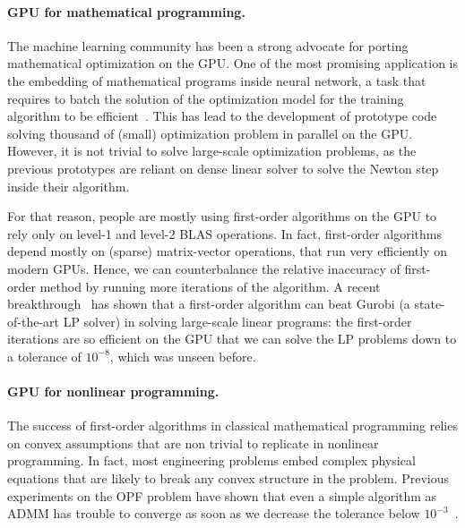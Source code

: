 \paragraph{GPU for mathematical programming.}
The machine learning community has been a strong advocate
for porting mathematical optimization on the GPU. One of the most
promising application is the embedding of mathematical programs
inside neural network, a task that requires to batch the solution
of the optimization model for the training algorithm to be efficient~\cite{amos2017optnet,pineda2022theseus}.
This has lead to the development of prototype code solving
thousand of (small) optimization problem in parallel on the GPU.
However, it is not trivial to solve large-scale optimization problems,
as the previous prototypes are reliant on dense linear solver
to solve the Newton step inside their algorithm.

For that reason, people are mostly using first-order algorithms on the GPU
to rely only on level-1 and level-2 BLAS operations.
In fact, first-order algorithms depend mostly on (sparse) matrix-vector operations, that run
very efficiently on modern GPUs. Hence, we can counterbalance
the relative inaccuracy of first-order method by running more
iterations of the algorithm.
A recent breakthrough~\cite{lu2023cupdlp,lu2023cupdlp2} has shown that a first-order algorithm
can beat Gurobi (a state-of-the-art LP solver) in solving large-scale linear programs:
the first-order iterations are so efficient on the GPU that we can solve the
LP problems down to a tolerance of $10^{-8}$, which was unseen before.


\paragraph{GPU for nonlinear programming.}
The success of first-order algorithms in classical mathematical programming
relies on convex assumptions that are non trivial to replicate
in nonlinear programming. In fact, most engineering problems embed complex
physical equations that are likely to break any convex structure in  the problem.
Previous experiments on the OPF problem have shown that even a simple
algorithm as ADMM has trouble to converge as soon as we decrease the
tolerance below $10^{-3}$~\cite{kim2021leveraging}.


